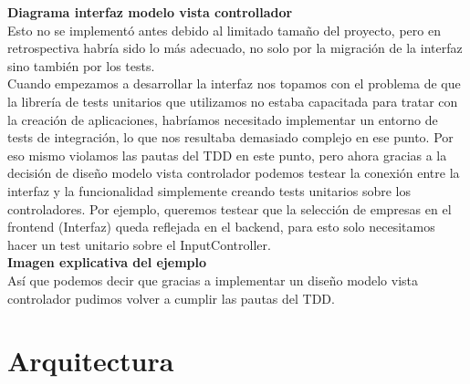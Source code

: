 \documentclass[12pt,a4paper]{article}
\begin{document}
	  \textbf{Diagrama interfaz modelo vista controllador}\\
	 Esto no se implementó antes debido al limitado tamaño del proyecto, pero en retrospectiva habría sido lo más adecuado, no solo por la migración de la interfaz sino también por los tests.\\
	 Cuando empezamos a desarrollar la interfaz nos topamos con el problema de que la librería de tests unitarios que utilizamos no estaba capacitada para tratar con la creación de aplicaciones, habríamos necesitado implementar un entorno de tests de integración, lo que nos resultaba demasiado complejo en ese punto. Por eso mismo violamos las pautas del TDD en este punto, pero ahora gracias a la decisión de diseño modelo vista controlador podemos testear la conexión entre la interfaz y la funcionalidad simplemente creando tests unitarios sobre los controladores. Por ejemplo, queremos testear que la selección de empresas en el frontend (Interfaz) queda reflejada en el backend, para esto solo necesitamos hacer un test unitario sobre el InputController.\\
\textbf{Imagen explicativa del ejemplo}\\
	Así que podemos decir que gracias a implementar un diseño modelo vista controlador pudimos volver a cumplir las pautas del TDD.\\
\pagebreak

	\section{Arquitectura}
\end{document}

